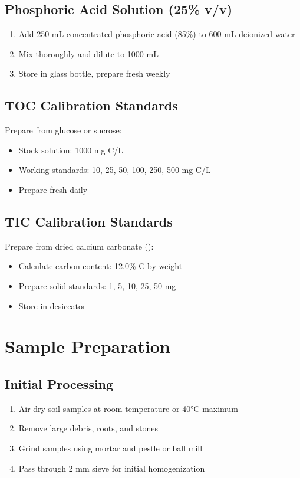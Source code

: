 \documentclass[11pt,a4paper]{article}\usepackage[]{graphicx}\usepackage[]{xcolor}
\begin{document}
\subsection{Phosphoric Acid Solution (25\% v/v)}
\begin{enumerate}[noitemsep]
    \item Add 250 mL concentrated phosphoric acid (85\%) to 600 mL deionized water
    \item Mix thoroughly and dilute to 1000 mL
    \item Store in glass bottle, prepare fresh weekly
\end{enumerate}

\subsection{TOC Calibration Standards}
Prepare from glucose or sucrose:
\begin{itemize}[noitemsep]
    \item Stock solution: 1000 mg C/L
    \item Working standards: 10, 25, 50, 100, 250, 500 mg C/L
    \item Prepare fresh daily
\end{itemize}

\subsection{TIC Calibration Standards}
Prepare from dried calcium carbonate ():
\begin{itemize}[noitemsep]
    \item Calculate carbon content: 12.0\% C by weight
    \item Prepare solid standards: 1, 5, 10, 25, 50 mg 
    \item Store in desiccator
\end{itemize}

\section{Sample Preparation}

\subsection{Initial Processing}
\begin{enumerate}[noitemsep]
    \item Air-dry soil samples at room temperature or 40°C maximum
    \item Remove large debris, roots, and stones
    \item Grind samples using mortar and pestle or ball mill
    \item Pass through 2 mm sieve for initial homogenization
\end{enumerate}
\end{document}
